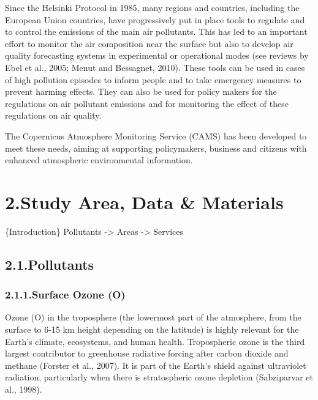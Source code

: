 \documentclass[9pt]{report}
\begin{document}
Since the Helsinki Protocol in 1985, many regions and countries, including the European Union countries, have progressively put in place tools to regulate and to control the emissions of the main air pollutants. 
This has led to an important effort to monitor the air composition near the surface but also to develop air quality forecasting systems in experimental or operational modes (see reviews by Ebel et al., 2005; Menut and Bessagnet, 2010).
These tools can be used in cases of high pollution episodes to inform people and to take emergency measures to prevent harming effects. 
They can also be used for policy makers for the regulations on air pollutant emissions and for monitoring the effect of these regulations on air quality.%

The Copernicus Atmosphere Monitoring Service (CAMS) 
has been developed to meet these needs, aiming at supporting policymakers, 
business and citizens with enhanced atmospheric environmental information.%

\section{2.\hspace*{0.5em}Study Area, Data \& Materials}\label{sec-study-area-data-materials}%

\noindent{}\{Introduction\}
Pollutants -\textgreater{} Areas -\textgreater{} Services%

\subsection{2.1.\hspace*{0.5em}Pollutants}\label{sec-pollutants}%

\subsubsection{2.1.1.\hspace*{0.5em}Surface Ozone (O)}\label{sec-surface-ozone-o3}%

\noindent{}Ozone (O) in the troposphere (the lowermost part of the atmosphere, from the surface to 6-15 km height depending on the latitude) is highly relevant for the Earth’s climate, ecosystems, and human health.
Tropospheric ozone is the third largest contributor to greenhouse radiative forcing after carbon dioxide and methane (Forster et al., 2007).
It is part of the Earth’s shield against ultraviolet radiation, particularly when there is stratospheric ozone depletion (Sabziparvar et al., 1998).%
\end{document}
